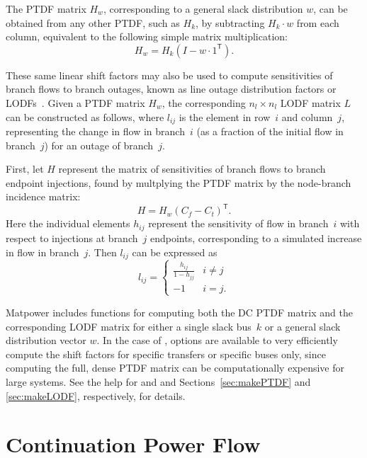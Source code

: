 \documentclass[12pt]{article}
\newcommand{\matpower}[0]{{\sc Matpower}}
\newcommand{\code}[1]{{\relsize{-0.5}{\tt{{#1}}}}}  %
\newcommand{\trans}[1]{{#1}^{\ensuremath{\mathsf{T}}}}  %
\numberwithin{equation}{section}
\numberwithin{table}{section}
\numberwithin{figure}{section}
\begin{document}
The PTDF matrix $H_w$, corresponding to a general slack distribution $w$, can be obtained from any other PTDF, such as $H_k$, by subtracting $H_k \cdot w$ from each column, equivalent to the following simple matrix multiplication:
\begin{equation}
H_w = H_k (I - w \cdot \trans{1}).
\end{equation}

These same linear shift factors may also be used to compute sensitivities of branch flows to branch outages, known as line outage distribution factors or LODFs~\cite{guler2007}. Given a PTDF matrix $H_w$, the corresponding $n_l \times n_l$ LODF matrix $L$ can be constructed as follows, where $l_{ij}$ is the element in row~$i$ and column~$j$, representing the change in flow in branch~$i$ (as a fraction of the initial flow in branch~$j$) for an outage of branch~$j$.

First, let $H$ represent the matrix of sensitivities of branch flows to branch endpoint injections, found by multplying the PTDF matrix by the node-branch incidence matrix:
\begin{equation}
H = H_w \trans{(C_f - C_t)}.
\end{equation}
Here the individual elements $h_{ij}$ represent the sensitivity of flow in branch~$i$ with respect to injections at branch~$j$ endpoints, corresponding to a simulated increase in flow in branch~$j$. Then $l_{ij}$ can be expressed as
\begin{equation}
l_{ij} = \left\{\begin{array}{cc}
\displaystyle\frac{h_{ij}}{1 - h_{jj}} & i \neq j \\
-1 & i = j.
\end{array}
\right.
\end{equation}

\matpower{} includes functions for computing both the DC PTDF matrix and the corresponding LODF matrix for either a single slack bus~$k$ or a general slack distribution vector $w$. In the case of \code{makePTDF}, options are available to very efficiently compute the shift factors for specific transfers or specific buses only, since computing the full, dense PTDF matrix can be computationally expensive for large systems.
See the help for \code{makePTDF} and \code{makeLODF} and Sections~\ref{sec:makePTDF} and \ref{sec:makeLODF}, respectively, for details.


\clearpage
\section{Continuation Power Flow}
\end{document}

